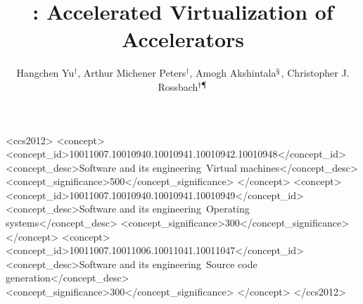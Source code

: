 \documentclass[sigplan,screen]{acmart}
\begin{document}


\title{\model: Accelerated Virtualization of Accelerators}

\begin{comment}
\author{Hangchen Yu}
\affiliation{%
	\institution{The University of Texas at Austin}
}
\email{hyu@cs.utexas.edu}

\author{Arthur M. Peters}
\affiliation{%
	\institution{The University of Texas at Austin}
}
\email{amp@cs.utexas.edu}

\author{Amogh Akshintala}
\affiliation{%
	\institution{The University of North Carolina at Chapel Hill}
}
\email{aakshintala@cs.unc.edu}

\author{Christopher J. Rossbach}
\affiliation{%
	\institution{The University of Texas at Austin and VMware Research}
}
\email{rossbach@cs.utexas.edu}
\end{comment}

\author{Hangchen Yu$^{\dagger}$, Arthur Michener Peters$^{\dagger}$, Amogh Akshintala$^{\mathsection}$, Christopher J. Rossbach$^{\dagger\mathparagraph}$}

\begin{CCSXML}
	<ccs2012>
	<concept>
	<concept_id>10011007.10010940.10010941.10010942.10010948</concept_id>
	<concept_desc>Software and its engineering~Virtual machines</concept_desc>
	<concept_significance>500</concept_significance>
	</concept>
	<concept>
	<concept_id>10011007.10010940.10010941.10010949</concept_id>
	<concept_desc>Software and its engineering~Operating systems</concept_desc>
	<concept_significance>300</concept_significance>
	</concept>
	<concept>
	<concept_id>10011007.10011006.10011041.10011047</concept_id>
	<concept_desc>Software and its engineering~Source code generation</concept_desc>
	<concept_significance>300</concept_significance>
	</concept>
	</ccs2012>
\end{CCSXML}

\end{document}
